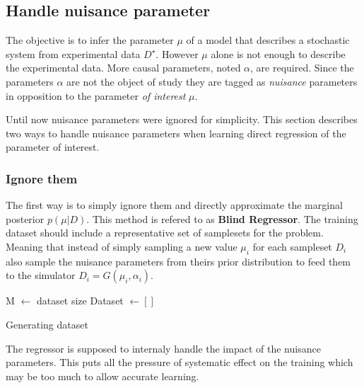 \subsection{Handle nuisance parameter} %
\label{sub:handle_nuisance_parameter}

The objective is to infer the parameter $\mu$ of a model that describes a stochastic system from experimental data $D^\star$.
However $\mu$ alone is not enough to describe the experimental data.
More causal parameters, noted $\alpha$, are required.
Since the parameters $\alpha$ are not the object of study they are tagged as \emph{nuisance} parameters in opposition to the parameter \emph{of interest} $\mu$.

Until now nuisance parameters were ignored for simplicity.
This section describes two ways to handle nuisance parameters when learning direct regression of the parameter of interest.





\subsubsection{Ignore them} %
\label{subsub:ignore_them}


The first way is to simply ignore them and directly approximate the marginal posterior $p(\mu|D)$.
This method is refered to as \textbf{Blind Regressor}.
The training dataset should include a representative set of samplesets for the problem.
Meaning that instead of simply sampling a new value $\mu_i$ for each sampleset $D_i$ also sample the nuisance parameters from theirs prior distribution to feed them to the simulator $D_i = G(\mu_i, \alpha_i)$.

\begin{algorithm}[H]
 M $\gets$ dataset size \;
 Dataset $\gets []$ \;
 \caption{Generating dataset}
\end{algorithm}


The regressor is supposed to internaly handle the impact of the nuisance parameters.
This puts all the pressure of systematic effect on the training which may be too much to allow accurate learning.






